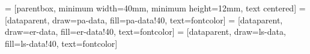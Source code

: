 


 = [parentbox, minimum width=40mm, minimum height=12mm, text centered]
 = [dataparent, draw=pa-data, fill=pa-data!40, text=fontcolor] 
 = [dataparent, draw=er-data, fill=er-data!40, text=fontcolor] 
 = [dataparent, draw=ls-data, fill=ls-data!40, text=fontcolor] 


